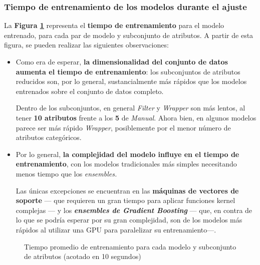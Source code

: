 \subsubsection{Tiempo de entrenamiento de los modelos durante el ajuste}

La \textbf{Figura \ref{fig:ch5traintime}} representa el \textbf{tiempo de entrenamiento} para el modelo entrenado, para cada par de modelo y subconjunto de atributos. A partir de esta figura, se pueden realizar las siguientes observaciones:

\begin{itemize}[leftmargin=*, parsep=2pt, itemsep=4pt, topsep=1pt]
	\item Como era de esperar, \textbf{la dimensionalidad del conjunto de datos aumenta el tiempo de entrenamiento}: los subconjuntos de atributos reducidos son, por lo general, sustancialmente más rápidos que los modelos entrenados sobre el conjunto de datos completo.
	
	Dentro de los subconjuntos, en general \textit{Filter} y \textit{Wrapper} son más lentos, al tener \textbf{10 atributos} frente a los \textbf{5} de \textit{Manual}. Ahora bien, en algunos modelos parece ser más rápido \textit{Wrapper}, posiblemente por el menor número de atributos categóricos.
	
	\item Por lo general, \textbf{la complejidad del modelo influye en el tiempo de entrenamiento}, con los modelos tradicionales más simples necesitando menos tiempo que los \textit{ensembles.}
	
	Las únicas excepciones se encuentran en las \textbf{máquinas de vectores de soporte} --- que requieren un gran tiempo para aplicar funciones kernel complejas --- y los \textbf{\textit{ensembles de Gradient Boosting}} --- que, en contra de lo que se podría esperar por su gran complejidad, son de los modelos más rápidos al utilizar una GPU para paralelizar su entrenamiento---.
\end{itemize}

\begin{figure}[h]
	\vspace{-6mm}
	\centering
	\captionsetup{belowskip=-40pt, justification=centering}
	\caption{Tiempo promedio de entrenamiento para cada modelo y subconjunto de atributos (acotado en 10 segundos)}
	\label{fig:ch5traintime}
\end{figure}

